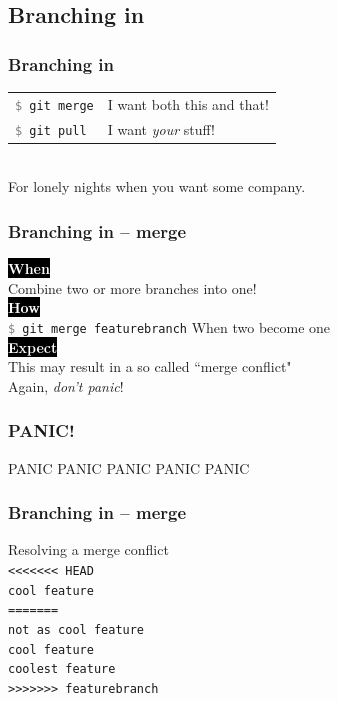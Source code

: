 \documentclass{beamer}
\newcommand{\keyword}[1]{\hspace{-1.0em}\colorbox{black}{\textcolor{white}{\textbf{#1}\vphantom{Ep}}}\vspace{0.2em}} %
\newcommand{\command}[1]{\texttt{\textcolor{gray}{\$} {#1}}}
\begin{document}
\subsection{Branching in}

\begin{frame}[fragile]
  \frametitle{Branching in}

  \begin{tabular}{ll}
    \command{git merge} & I want both this and that! \\
    \command{git pull} & I want \emph{your} stuff! \\
  \end{tabular} \\ [3em]

  For lonely nights when you want some company.

\end{frame}

\begin{frame}
  \frametitle{Branching in -- merge} %

    \keyword{When} \\
    Combine two or more branches into one! \\[1em]

    \keyword{How} \\
    \command{git merge featurebranch} \hspace{1em} When two become one \\[3em]

    \pause
    \keyword{Expect} \\
    This may result in a so called ``\alert{merge conflict}" \\[1em]

    Again, \emph{don't panic}!
\end{frame}

\begin{frame}
  \frametitle{PANIC!}

    \begin{center}
        \Huge \alert{PANIC PANIC PANIC PANIC PANIC}
    \end{center}
\end{frame}

\begin{frame}
  \frametitle{Branching in -- merge} %

    Resolving a merge conflict \\[1em]

        \texttt{<<<<<<< HEAD} \\
        \texttt{cool feature} \\
        \texttt{=======} \\
        \texttt{not as cool feature} \\
        \texttt{cool feature} \\
        \texttt{coolest feature} \\
        \texttt{>>>>>>> featurebranch}
\end{frame}
\end{document}

